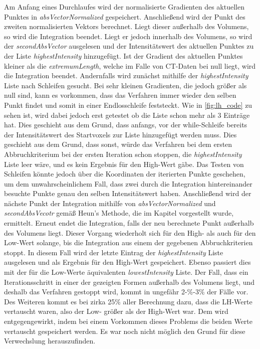Am Anfang eines Durchlaufes wird der normalisierte Gradienten des aktuellen Punktes in \textit{absVectorNormalized} gespeichert. Anschließend wird der Punkt des zweiten normalisierten Vektors berechnet. Liegt dieser außerhalb des Volumens, so wird die Integration beendet. Liegt er jedoch innerhalb des Volumens, so wird der \textit{secondAbsVector} ausgelesen und der Intensitätswert des aktuellen Punktes zu der Liste \textit{highestIntensity} hinzugefügt. Ist der Gradient des aktuellen Punktes kleiner als die \textit{extremumLength}, welche im Falle von CT-Daten bei null liegt, wird die Integration beendet.
\newline
Andernfalls wird zunächst mithilfe der \textit{highestIntensity} Liste nach Schleifen gesucht. Bei sehr kleinen Gradienten, die jedoch größer als null sind, kann es vorkommen, dass das Verfahren immer wieder den selben Punkt findet und somit in einer Endlosschleife feststeckt.
\newline
Wie in \autoref{fig:lh_code} zu sehen ist, wird dabei jedoch erst getestet ob die Liste schon mehr als 3 Einträge hat. Dies geschieht aus dem Grund, dass anfangs, vor der while-Schleife bereits der Intensitätswert des Startvoxels zur Liste hinzugefügt werden muss. Dies geschieht aus dem Grund, dass sonst, würde das Verfahren bei dem ersten Abbruchkriterium bei der ersten Iteration schon stoppen, die \textit{highestIntensity} Liste leer wäre, und es kein Ergebnis für den High-Wert gäbe.
\newline
Das Testen von Schleifen könnte jedoch über die Koordinaten der iterierten Punkte geschehen, um dem unwahrscheinlichem Fall, dass zwei durch die Integration hintereinander besuchte Punkte genau den selben Intensitätswert haben.
\newline
Anschließend wird der nächste Punkt der Integration mithilfe von \textit{absVectorNormalized} und \textit{secondAbsVecotr} gemäß Heun's Methode, die im Kapitel  vorgestellt wurde, ermittelt. Erneut endet die Integration, falls der neu berechnete Punkt außerhalb des Volumens liegt.
\newline
Dieser Vorgang wiederholt sich für den High- als auch für den Low-Wert solange, bis die Integration aus einem der gegebenen Abbruchkriterien stoppt. In diesem Fall wird der letzte Eintrag der \textit{highestIntensity} Liste ausgelesen und als Ergebnis für den High-Wert gespeichert. Ebenso passiert dies mit der für die Low-Werte äquivalenten \textit{lowestIntensity} Liste.
\newline
Der Fall, dass ein Iterationsschritt in einer der gezeigten Formen außerhalb des Volumens liegt, und deshalb das Verfahren gestoppt wird, kommt in ungefähr 2-\%-3\% der Fälle vor. Des Weiteren kommt es bei zirka 25\% aller Berechnung dazu, dass die LH-Werte vertauscht waren, also der Low- größer als der High-Wert war. Dem wird entgegengewirkt, indem bei einem Vorkommen dieses Problems die beiden Werte vertauscht gespeichert werden. Es war noch nicht möglich den Grund für diese Verwechslung herauszufinden.



